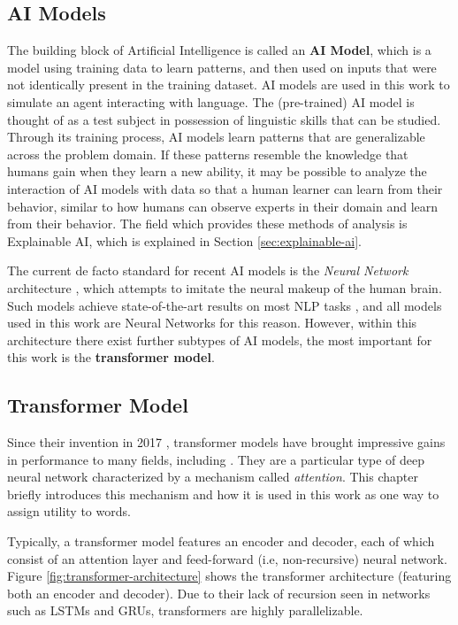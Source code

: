 \subsection{AI Models}
The building block of Artificial Intelligence is called an \textbf{AI Model}, which is a model using training data to learn patterns, and then used on inputs that were not identically present in the training dataset.
AI models are used in this work to simulate an agent interacting with language.
The (pre-trained) AI model is thought of as a test subject in possession of linguistic skills that can be studied.
Through its training process, AI models learn patterns that are generalizable across the problem domain.
If these patterns resemble the knowledge that humans gain when they learn a new ability, it may be possible to analyze the interaction of AI models with data so that a human learner can learn from their behavior, similar to how humans can observe experts in their domain and learn from their behavior.
The field which provides these methods of analysis is Explainable AI, which is explained in Section \ref{sec:explainable-ai}.

The current de facto standard for recent AI models is the \textit{Neural Network} architecture \cite{jurafskySpeechLanguageProcessing2025}, which attempts to imitate the neural makeup of the human brain.
Such models achieve state-of-the-art results on most NLP tasks , and all models used in this work are Neural Networks for this reason.
However, within this architecture there exist further subtypes of AI models, the most important for this work is the \textbf{transformer model}.


\subsection{Transformer Model} \label{sec:transformer}
Since their invention in 2017 \cite{vaswani2017attention}, transformer models have brought impressive gains in performance to many fields, including \NLP.
They are a particular type of deep neural network characterized by a mechanism called \textit{attention}.
This chapter briefly introduces this mechanism and how it is used in this work as one way to assign utility to words.

Typically, a transformer model features an encoder and decoder, each of which consist of an attention layer and feed-forward (i.e, non-recursive) neural network.
Figure \ref{fig:transformer-architecture} shows the transformer architecture (featuring both an encoder and decoder).
Due to their lack of recursion seen in networks such as LSTMs and GRUs, transformers are highly parallelizable.

